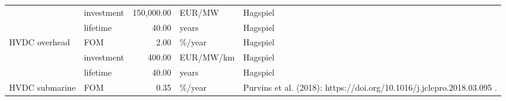 \begin{longtable}{p{5cm}p{3cm}rp{3cm}p{11cm}}
                      & investment &     150,000.00 &                            EUR/MW &                                                                                                                                                                                                                                                                                                                             Hagspiel \\
                      & lifetime &          40.00 &                             years &                                                                                                                                                                                                                                                                                                                             Hagspiel \\
HVDC overhead & FOM &           2.00 &                            \%/year &                                                                                                                                                                                                                                                                                                                             Hagspiel \\
                      & investment &         400.00 &                         EUR/MW/km &                                                                                                                                                                                                                                                                                                                             Hagspiel \\
                      & lifetime &          40.00 &                             years &                                                                                                                                                                                                                                                                                                                             Hagspiel \\
HVDC submarine & FOM &           0.35 &                            \%/year &                                                                                                                                                                                                                                                               Purvins et al. (2018): https://doi.org/10.1016/j.jclepro.2018.03.095 . \\

\end{longtable}
